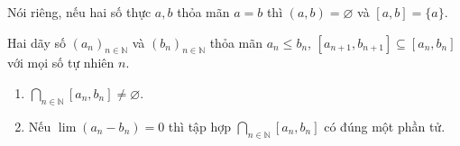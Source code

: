 Nói riêng, nếu hai số thực $a, b$ thỏa mãn $a = b$ thì $(a, b) = \varnothing$ và $[a, b] = \{ a \}$.

\begin{appendixthm}
    Hai dãy số ${(a_{n})}_{n\in\mathbb{N}}$ và ${(b_{n})}_{n\in\mathbb{N}}$ thỏa mãn $a_{n}\leq b_{n}$, $[a_{n+1}, b_{n+1}]\subseteq [a_{n}, b_{n}]$ với mọi số tự nhiên $n$.
    \begin{enumerate}[label={(\roman*)}]
        \item $\bigcap_{n\in\mathbb{N}} [a_{n}, b_{n}]\ne \varnothing$.
        \item Nếu $\lim (a_{n} - b_{n}) = 0$ thì tập hợp $\bigcap_{n\in\mathbb{N}} [a_{n}, b_{n}]$ có đúng một phần tử.
    \end{enumerate}
\end{appendixthm}

